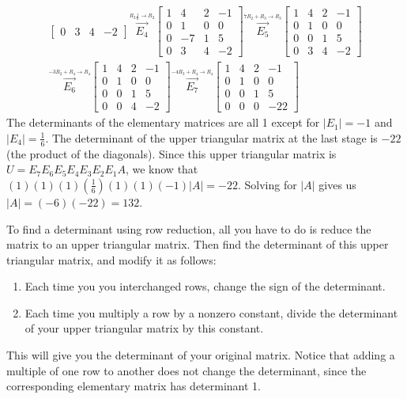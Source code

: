 \begin{example}
\begin{align*}
\begin{bmatrix}
 0 & 3 & 4 & -2 
\end{bmatrix}
\stackrel{\xrightarrow{R_2\frac{1}{6}\to R_2}}{E_4}
\begin{bmatrix}
 1 & 4 & 2 & -1\\
 0 & 1 & 0 & 0 \\
 0 & -7 & 1 & 5 \\
 0 & 3 & 4 & -2 
\end{bmatrix}
\stackrel{\xrightarrow{7R_2+R_3\to R_3}}{E_5}
\begin{bmatrix}
 1 & 4 & 2 & -1\\
 0 & 1 & 0 & 0 \\
 0 & 0 & 1 & 5 \\
 0 & 3 & 4 & -2 
\end{bmatrix}
\\
\stackrel{\xrightarrow{-3R_2+R_4\to R_4}}{E_6}
\begin{bmatrix}
 1 & 4 & 2 & -1\\
 0 & 1 & 0 & 0 \\
 0 & 0 & 1 & 5 \\
 0 & 0 & 4 & -2 
\end{bmatrix}
\stackrel{\xrightarrow{-4R_3+R_4\to R_4}}{E_7}
\begin{bmatrix}
 1 & 4 & 2 & -1\\
 0 & 1 & 0 & 0 \\
 0 & 0 & 1 & 5 \\
 0 & 0 & 0 & -22 
\end{bmatrix}
\end{align*}
The determinants of the elementary matrices are all 1 except for $|E_1|=-1$ and $|E_4|=\frac{1}{6}$.  
The determinant of the upper triangular matrix at the last stage is $-22$ (the product of the diagonals).
Since this upper triangular matrix is  $U=E_7E_6E_5E_4E_3E_2E_1A$, we know that $(1)(1)(1)(\frac{1}{6})(1)(1)(-1)|A|=-22$. Solving for $|A|$ gives us $|A|=(-6)(-22)=132$. 

\end{example}

To find a determinant using row reduction, all you have to do is reduce the matrix to an upper triangular matrix. Then find the determinant of this upper triangular matrix, and modify it as follows: 
\begin{enumerate}
	\item Each time you you interchanged rows, change the sign of the determinant. 
	\item Each time you  multiply a row by a nonzero constant, divide the determinant of your upper triangular matrix by this constant.  
\end{enumerate}
This will give you the determinant of your original matrix.  Notice that adding a multiple of one row to another does not change the determinant, since the corresponding elementary matrix has determinant 1.


